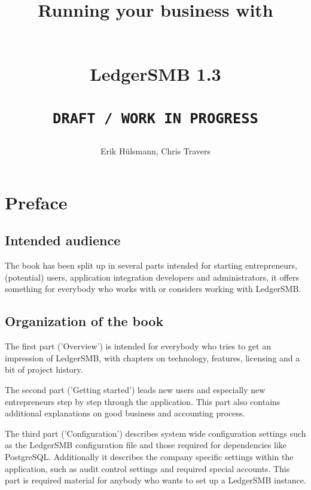 \documentclass[10pt,a4paper]{book}
\begin{document}




\author{Erik H\"ulsmann, Chris Travers}
\title{\begin{Large}
Running your business with
\end{Large} \\
LedgerSMB 1.3 \\
 ~ \\
\texttt{DRAFT / WORK IN PROGRESS} }


\maketitle


\tableofcontents

\listoffigures

\listoftables

\printglossaries

\chapter*{Preface}
\label{preface}

\section*{Intended audience}
\label{sec-intended-audience}

The book has been split up in several parts intended for starting entrepreneurs,
(potential) users, application integration developers and
administrators, it offers something for everybody who works with or considers working with
LedgerSMB.

\section*{Organization of the book}
\label{sec-book-organization}

The first
part ('Overview') is intended for everybody who tries to get an impression of LedgerSMB, with
chapters on technology, features, licensing and a bit of project history.

The second part
('Getting started') leads new users and especially new entrepreneurs step by step through the
application. This part also contains additional explanations on good business and accounting
process.

The third part ('Configuration') describes system wide configuration settings such as
the LedgerSMB configuration file and those required for dependencies like PostgreSQL. Additionally
it describes the company specific settings within the application, such as audit control settings
and required special accounts. This part is required material for anybody who wants to set up
a LedgerSMB instance.
\end{document}
